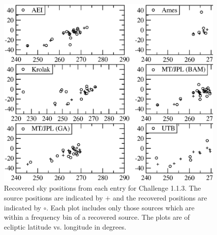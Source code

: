 \documentclass[12pt]{iopart}
\begin{document}
\begin{figure}
\includegraphics[angle=0,width=1.0\textwidth]{1.1.3.skyposition6.eps}
\caption{\label{1.1.3skypo}Recovered sky positions from each entry for Challenge 1.1.3. The source positions are indicated by $+$ and the recovered positions are indicated by $\circ$. Each plot includes only those sources which are within a frequency bin of a recovered source. The plots are of ecliptic latitude vs. longitude in degrees.}
\end{figure}
\end{document}
